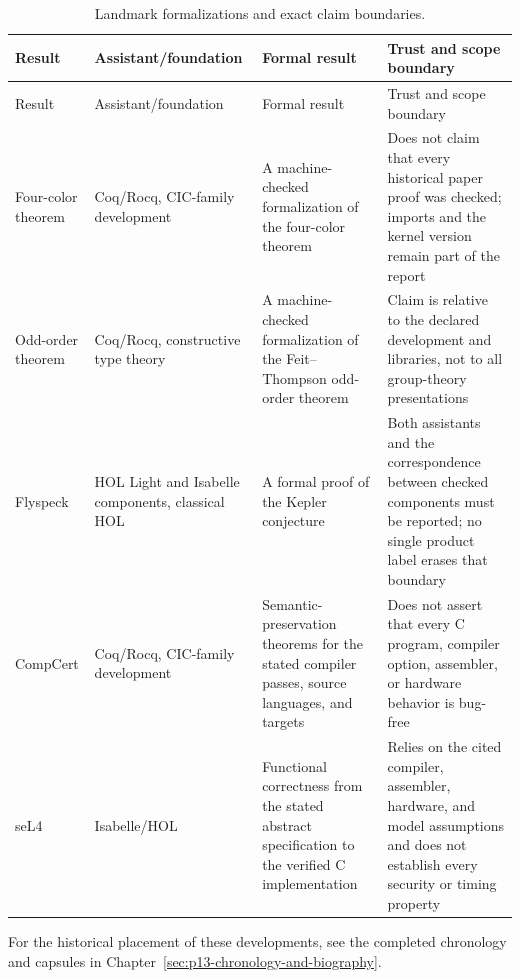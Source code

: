 \begin{landscape}
\thispagestyle{plain}
\begingroup\scriptsize
\setlength{\tabcolsep}{3pt}
\begin{longtable}{@{}p{1.05in}p{1.20in}p{2.10in}p{2.75in}@{}}
\caption{Landmark formalizations and exact claim boundaries.}
\label{tab:p12-landmark-formalizations}\\
\toprule
Result & Assistant/foundation & Formal result & Trust and scope boundary \\
\midrule
\endfirsthead
\toprule
Result & Assistant/foundation & Formal result & Trust and scope boundary \\
\midrule
\endhead
Four-color theorem & Coq/Rocq, CIC-family development & A machine-checked
formalization of the four-color theorem & Does not claim that every historical
paper proof was checked; imports and the kernel version remain part of the
report \cite{Gonthier2008} \\ \addlinespace
Odd-order theorem & Coq/Rocq, constructive type theory & A machine-checked
formalization of the Feit--Thompson odd-order theorem & Claim is relative to the
declared development and libraries, not to all group-theory presentations
\cite{GonthierEtAl2013} \\ \addlinespace
Flyspeck & HOL Light and Isabelle components, classical HOL & A formal proof of
the Kepler conjecture & Both assistants and the correspondence between checked
components must be reported; no single product label erases that boundary
\cite{HalesEtAl2017} \\ \addlinespace
CompCert & Coq/Rocq, CIC-family development & Semantic-preservation theorems
for the stated compiler passes, source languages, and targets & Does not assert
that every C program, compiler option, assembler, or hardware behavior is
bug-free \cite{Leroy2009} \\ \addlinespace
seL4 & Isabelle/HOL & Functional correctness from the stated abstract
specification to the verified C implementation & Relies on the cited compiler,
assembler, hardware, and model assumptions and does not establish every
security or timing property \cite{KleinEtAl2009} \\
\bottomrule
\end{longtable}
\endgroup
\end{landscape}

For the historical placement of these developments, see the completed
chronology and capsules in Chapter~\ref{sec:p13-chronology-and-biography}.

